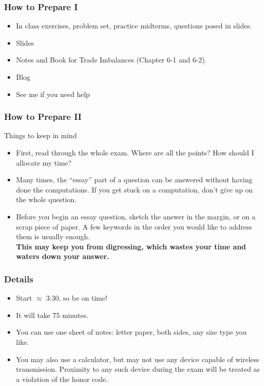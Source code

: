\documentclass[9pt]{beamer}
\begin{document}


\begin{frame}[t]
\frametitle{How to Prepare I}
\begin{itemize}
\item In class exercises, problem set, practice midterms, questions posed in slides.
\medskip
\item Slides
\medskip
\item Notes and Book for Trade Imbalances (Chapter 6-1 and 6-2).
\medskip
\item Blog
\medskip
\item See me if you need help
\end{itemize}
\end{frame}


\begin{frame}[t]
\frametitle{How to Prepare II}
Things to keep in mind
\medskip
\begin{itemize}
\item First, read through the whole exam. Where are all the points? How should I allocate
my time?
\medskip
\item Many times, the ``essay'' part of a question can be answered without having done
the computations. If you get stuck on a computation, don't give up on the whole
question.
\medskip
\item Before you begin an essay question, sketch the answer in the margin, or on a scrap
piece of paper. A few keywords in the order you would like to address them is usually
enough.\\
\smallskip
 \textbf{This may keep you from digressing, which wastes your time and waters down
your answer.}\\
\end{itemize}
\bigskip
\end{frame}


\begin{frame}[t]
\frametitle{Details}
\bigskip
\begin{itemize}
\item Start $\approx$ 3:30, so be on time!
\bigskip
\item It will take 75 minutes.
\bigskip
\item You can use one sheet of notes: letter paper, both sides, any size type you like.
\bigskip
\item You may also use a calculator, but may not use any device capable of wireless transmission. Proximity to any such device during the exam will be treated as a violation of the honor
code.
\bigskip
\end{itemize}
\bigskip
\end{frame}
\end{document}
